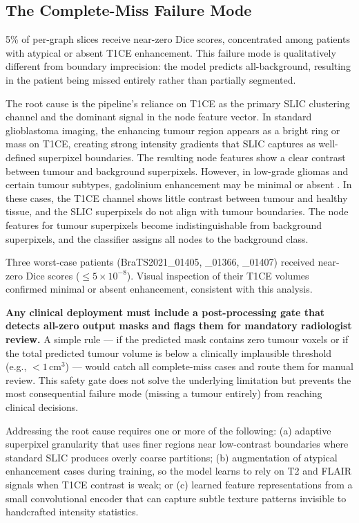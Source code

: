 \documentclass{article}
\begin{document}
\subsection{The Complete-Miss Failure Mode}

5\% of per-graph slices receive near-zero Dice scores, concentrated among patients
with atypical or absent T1CE enhancement. This failure mode is qualitatively
different from boundary imprecision: the model predicts all-background, resulting
in the patient being missed entirely rather than partially segmented.

The root cause is the pipeline's reliance on T1CE as the primary SLIC clustering
channel and the dominant signal in the node feature vector. In standard glioblastoma
imaging, the enhancing tumour region appears as a bright ring or mass on T1CE,
creating strong intensity gradients that SLIC captures as well-defined superpixel
boundaries. The resulting node features show a clear contrast between tumour and
background superpixels. However, in low-grade gliomas and certain tumour subtypes,
gadolinium enhancement may be minimal or absent \cite{louis2016glioma}. In these
cases, the T1CE channel shows little contrast between tumour and healthy tissue,
and the SLIC superpixels do not align with tumour boundaries. The node features
for tumour superpixels become indistinguishable from background superpixels, and
the classifier assigns all nodes to the background class.

Three worst-case patients (BraTS2021\_01405, \_01366, \_01407) received near-zero
Dice scores ($\leq 5\times10^{-8}$). Visual inspection of their T1CE volumes
confirmed minimal or absent enhancement, consistent with this analysis.

\textbf{Any clinical deployment must include a post-processing gate that detects
all-zero output masks and flags them for mandatory radiologist review.} A simple
rule --- if the predicted mask contains zero tumour voxels or if the total predicted
tumour volume is below a clinically implausible threshold (e.g., $< 1$\,cm$^3$) ---
would catch all complete-miss cases and route them for manual review. This safety
gate does not solve the underlying limitation but prevents the most consequential
failure mode (missing a tumour entirely) from reaching clinical decisions.

Addressing the root cause requires one or more of the following: (a) adaptive
superpixel granularity that uses finer regions near low-contrast boundaries where
standard SLIC produces overly coarse partitions; (b) augmentation of atypical
enhancement cases during training, so the model learns to rely on T2 and FLAIR
signals when T1CE contrast is weak; or (c) learned feature representations from a
small convolutional encoder that can capture subtle texture patterns invisible to
handcrafted intensity statistics.
\end{document}
